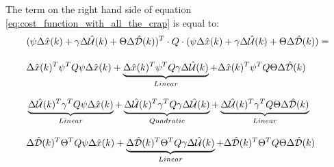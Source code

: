 The term on the right hand side of equation \ref{eq:cost_function_with_all_the_crap} is equal to:
\begin{equation}\label{eq:cost_function_big_eq}
	\begin{aligned}
	&(\psi\Delta \hat{x}(k) + \gamma\Delta \hat{\CMcal{U}}(k) + \Theta\Delta \hat{\CMcal{D}}(k))^T\cdot Q \cdot (\psi\Delta \hat{x}(k) + \gamma\Delta \hat{\CMcal{U}}(k) + \Theta\Delta \hat{\CMcal{D}}(k)) = \\[10pt]
	& \Delta \hat{x}(k)^T\psi ^T Q \psi \Delta \hat{x}(k) + \underbrace{\Delta \hat{x}(k)^T \psi ^T Q \gamma \Delta  \hat{\CMcal{U}}(k) }_{Linear} +\Delta \hat{x}(k)^T \psi ^T Q \Theta \Delta \hat{\CMcal{D}}(k) \\[8pt]
	& \underbrace{\Delta \hat{\CMcal{U}}(k)^T \gamma ^T Q \psi\Delta \hat{x}(k)}_{Linear} + \underbrace{\Delta \hat{\CMcal{U}}(k)^T\gamma ^T Q \gamma\Delta \hat{\CMcal{U}}(k)}_{Quadratic} +\underbrace{\Delta \hat{\CMcal{U}}(k)^T \gamma ^T Q\Theta \Delta\hat{\CMcal{D}}(k)}_{Linear} \\[8pt] 
	& \Delta \hat{\CMcal{D}}(k)^T \Theta ^T Q  \psi \Delta \hat{x}(k)					+ \underbrace{\Delta \hat{\CMcal{D}}(k)^T \Theta ^T Q \gamma  \Delta \hat{\CMcal{U}}(k) }_{Linear}	+\Delta \hat{\CMcal{D}}(k)^T \Theta ^T Q \Theta \Delta \hat{\CMcal{D}}(k)
		\end{aligned}
\end{equation}

